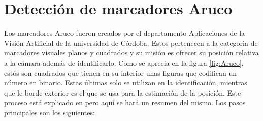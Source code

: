 \section{Detección de marcadores Aruco} \label{sec:detectAruco}
	Los marcadores Aruco fueron creados por el departamento Aplicaciones de la Visión Artificial de la universidad de Córdoba. Estos pertenecen a la categoria de marcadores visuales planos y cuadrados y su misión es ofrecer su posición relativa a la cámara además de identificarlo. 
	Como se aprecia en la figura \ref{fig:Aruco}, estós son cuadrados que tienen en su interior unas figuras que codifican un número en binario. Estas últimas solo se utilizan en la identificación, mientras que le borde exterior es el que se usa para la estimación de la posición. Este proceso está explicado en \cite{aruco2014} pero aquí se hará un resumen del mismo. Los pasos principales son los siguientes:
\figAruco

